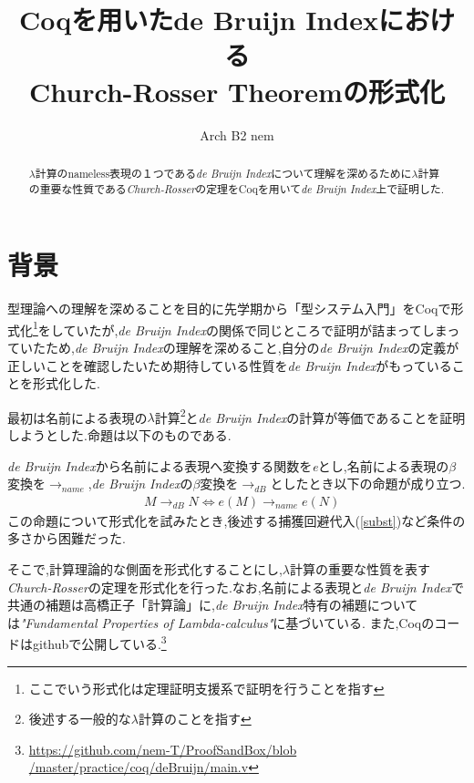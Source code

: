 \documentclass[a4j,10pt]{jsarticle}
\title{Coqを用いたde Bruijn Indexにおける\\Church-Rosser Theoremの形式化}
\author{Arch B2 nem}
\theoremstyle{definition}
\begin{document}
\begin{abstract}
\(\lambda\)計算のnameless表現の１つである{\sl de Bruijn Index}について理解を深めるために\(\lambda\)計算の重要な性質である{\sl Church-Rosser}の定理をCoqを用いて{\sl de Bruijn Index}上で証明した.
\end{abstract}
\maketitle

\section{背景}
型理論への理解を深めることを目的に先学期から「型システム入門」\cite{tapl}をCoqで形式化\footnote{ここでいう形式化は定理証明支援系で証明を行うことを指す}をしていたが,{\sl de Bruijn Index}の関係で同じところで証明が詰まってしまっていたため,{\sl de Bruijn Index}の理解を深めること,自分の{\sl de Bruijn Index}の定義が正しいことを確認したいため期待している性質を{\sl de Bruijn Index}がもっていることを形式化した.\par
最初は名前による表現の\(\lambda\)計算\footnote{後述する一般的な\(\lambda\)計算のことを指す}と{\sl de Bruijn Index}の計算が等価であることを証明しようとした.命題は以下のものである.\par
{\sl de Bruijn Index}から名前による表現へ変換する関数を{\sl e}とし,名前による表現の\( \beta \)変換を\( \rightarrow_{name} \),{\sl de Bruijn Index}の\(\beta\)変換を\(\rightarrow_{dB}\)としたとき以下の命題が成り立つ.
\begin{align}
& M \rightarrow_{dB} N \Leftrightarrow e (M) \rightarrow_{name} e (N)
\end{align}
この命題について形式化を試みたとき,後述する捕獲回避代入(\ref{subst})など条件の多さから困難だった.\par
そこで,計算理論的な側面を形式化することにし,\(\lambda\)計算の重要な性質を表す{\sl Church-Rosser}の定理を形式化を行った.なお,名前による表現と{\sl de Bruijn Index}で共通の補題は高橋正子「計算論」\cite{takahashi}に,{\sl de Bruijn Index}特有の補題については{\sl "Fundamental Properties of Lambda-calculus"}\cite{isabelle}に基づいている. また,Coqのコードはgithubで公開している.\footnote{\href{https://github.com/NeM-T/ProofSandBox/blob/master/practice/coq/deBruijn/main.v}{https://github.com/nem-T/ProofSandBox/blob \\ /master/practice/coq/deBruijn/main.v}}
\end{document}
